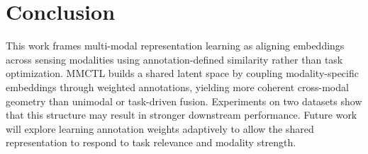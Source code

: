 \documentclass[lettersize,journal]{IEEEtran}
\begin{document}
\section{Conclusion}
This work frames multi-modal representation learning as aligning embeddings across sensing modalities using annotation-defined similarity rather than task optimization. MMCTL builds a shared latent space by coupling modality-specific embeddings through weighted annotations, yielding more coherent cross-modal geometry than unimodal or task-driven fusion. Experiments on two datasets show that this structure may result in stronger downstream performance. Future work will explore learning annotation weights adaptively to allow the shared representation to respond to task relevance and modality strength.










\vfill
\end{document}
